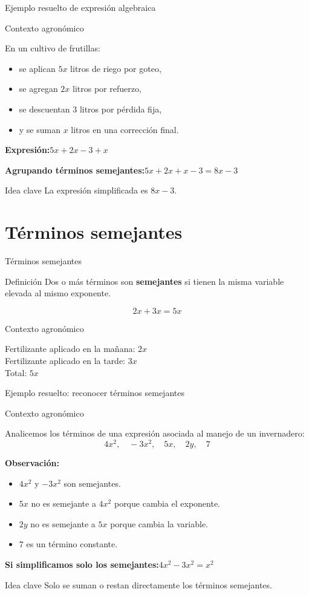 \documentclass[handout,aspectratio=169,12pt]{beamer}
\newcommand{\IdeaClave}[1]{
	\begin{alertblock}{Idea clave}
		#1
	\end{alertblock}
}
\newcommand{\Agronomia}[1]{
	\begin{exampleblock}{Contexto agronómico}
		#1
	\end{exampleblock}
}
\begin{document}
	\begin{frame}{Ejemplo resuelto de expresión algebraica}
		\Agronomia{
			En un cultivo de frutillas:
			\begin{itemize}
				\item se aplican \(5x\) litros de riego por goteo,
				\pause
				\item se agregan \(2x\) litros por refuerzo,
				\pause
				\item se descuentan \(3\) litros por pérdida fija,
				\pause
				\item y se suman \(x\) litros en una corrección final.
			\end{itemize}
		}
		
		\pause
		\textbf{Expresión:}\quad $5x+2x-3+x$
		
		\pause
		\textbf{Agrupando términos semejantes:}\quad $5x+2x+x-3=8x-3$
		
		\pause
		\IdeaClave{La expresión simplificada es \(8x-3\).}
	\end{frame}
	
	\section{Términos semejantes}
	\begin{frame}{Términos semejantes}
		\begin{block}{Definición}
			Dos o más términos son \textbf{semejantes} si tienen la misma variable elevada al mismo exponente.
		\end{block}
		
		\pause
		\[
		2x+3x=5x
		\]
		
		\pause
		\Agronomia{
			Fertilizante aplicado en la mañana: \(2x\) \\
			Fertilizante aplicado en la tarde: \(3x\) \\
			Total: \(5x\)
		}
	\end{frame}
	
	\begin{frame}{Ejemplo resuelto: reconocer términos semejantes}
		\Agronomia{
			Analicemos los términos de una expresión asociada al manejo de un invernadero:
			\[
			4x^2,\quad -3x^2,\quad 5x,\quad 2y,\quad 7
			\]
		}
		
		\pause
		\textbf{Observación:}
		\begin{itemize}
			\item \(4x^2\) y \(-3x^2\) son semejantes.
			\pause
			\item \(5x\) no es semejante a \(4x^2\) porque cambia el exponente.
			\pause
			\item \(2y\) no es semejante a \(5x\) porque cambia la variable.
			\pause
			\item \(7\) es un término constante.
		\end{itemize}
		
		\pause
		\textbf{Si simplificamos solo los semejantes:}\quad $4x^2-3x^2=x^2$
		
		\pause
		\IdeaClave{Solo se suman o restan directamente los términos semejantes.}
	\end{frame}
	
\end{document}
